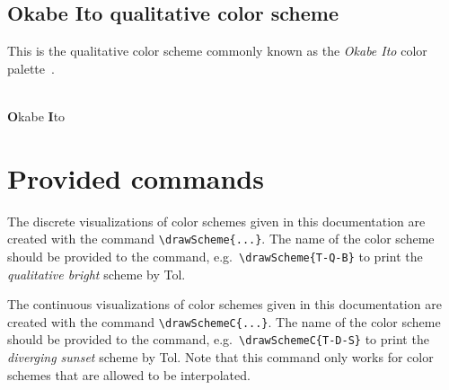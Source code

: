 \documentclass{scrartcl}
\newcommand\marg[1]{\leavevmode\marginpar{\raggedleft #1}}
\begin{document}
\subsection{Okabe Ito qualitative color scheme}\label{sec:OkabeIto}
This is the qualitative color scheme commonly known as the \emph{Okabe Ito} color palette~\cite{Ichihara_2008}.

\begin{center}
    \\
    \textbf{O}kabe \textbf{I}to
\end{center}

\section{Provided commands}
\cprotect\marg{\verb!\drawScheme{...}!}%
The discrete visualizations of color schemes given in this documentation are created with the command \verb!\drawScheme{...}!.
The name of the color scheme should be provided to the command, e.g.\ \verb!\drawScheme{T-Q-B}! to print the \emph{qualitative bright} scheme by Tol.

\cprotect\marg{\verb!\drawSchemeC{...}!}%
The continuous visualizations of color schemes given in this documentation are created with the command \verb!\drawSchemeC{...}!.
The name of the color scheme should be provided to the command, e.g.\ \verb!\drawSchemeC{T-D-S}! to print the \emph{diverging sunset} scheme by Tol.
Note that this command only works for color schemes that are allowed to be interpolated.

\clearpage
\printbibliography
\end{document}
